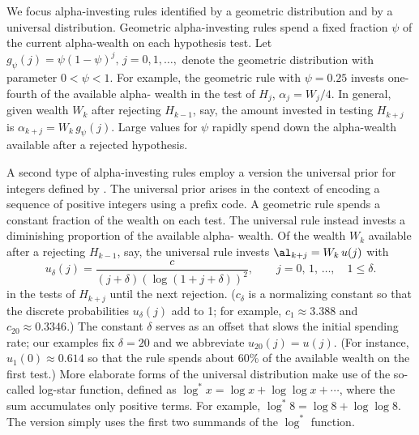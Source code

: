 \documentclass[12pt]{article}
\begin{document}
 
 We focus alpha-investing rules identified by a geometric distribution and by a
 universal distribution.  Geometric alpha-investing rules spend a fixed fraction
 $\psi$ of the current alpha-wealth on each hypothesis test.  Let $g_\psi(j) =
 \psi(1-\psi)^{j},\, j=0,1,\ldots,$ denote the geometric distribution with
 parameter $0 < \psi < 1$.   For example, the
 geometric rule with $\psi = 0.25$ invests one-fourth of the available alpha-
 wealth in the test of $H_j$, $\alpha_j = W_j/4$.  In general, given wealth
 $W_{k}$ after rejecting $H_{k-1}$, say, the amount invested in testing
 $H_{k+j}$ is $\alpha_{k+j} = W_k \, g_\psi(j)$.  Large values for $\psi$
 rapidly spend down the alpha-wealth available after a rejected hypothesis.
 

 A second type of alpha-investing rules employ a version the universal prior for
 integers defined by \citet{rissanen83}.  The universal prior arises in the
 context of encoding a sequence of positive integers using a prefix code.  A
 geometric rule spends a constant fraction of the wealth on each test.  The
 universal rule instead invests a diminishing proportion of the available alpha-
 wealth.  Of the wealth $W_k$ available after a rejecting $H_{k-1}$, say, the
 universal rule invests $\al_{k+j} = W_k\,u(j)$ with
 \begin{equation}
   u_\delta(j) = \frac{c}{ (j+\delta) (\log (1+j+\delta))^2}, \qquad 
                 j =  0,\,1,\,\ldots, \quad 1 \le \delta.
 \label{eq:univ}
 \end{equation}
 in the tests of $H_{k+j}$ until the next rejection. ($c_\delta$ is a
 normalizing constant so that the discrete probabilities $u_\delta(j)$ add to 1;
 for example, $c_{1} \approx 3.388$ and $c_{20} \approx 0.3346$.)  The constant
 $\delta$ \marginpar{$\delta$} serves as an offset that slows the initial
 spending rate; our examples fix $\delta=20$ and we abbreviate $u_{20}(j) =
 u(j)$. (For instance, $u_1(0) \approx 0.614$ so that the rule spends about 60\%
 of the available wealth on the first test.)  More elaborate forms of the
 universal distribution make use of the so-called log-star function, defined as
 $\log^* x = \log x + \log \log x + \cdots$, where the sum accumulates only
 positive terms.  For example, $\log^{*} 8 = \log 8 + \log \log 8$.  The version
  simply uses the first two summands of the $\log^{*}$ function.
 
 

\end{document}
